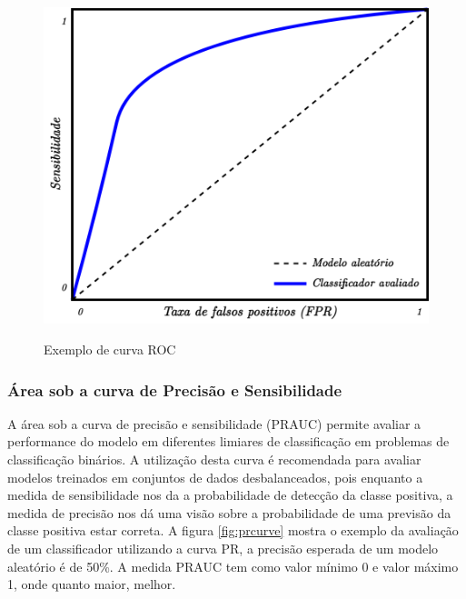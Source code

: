 \begin{figure}[htbp]
	\centering
	\caption{Exemplo de curva ROC}
		\includegraphics[scale=.25]{imagens/auroc.png}
	\label{fig:aucroc}
\end{figure}

\subsubsection{Área sob a curva de Precisão e Sensibilidade}

A área sob a curva de precisão e sensibilidade (PRAUC) permite avaliar a performance do modelo em diferentes limiares de classificação em problemas de classificação binários.
A utilização desta curva é recomendada para avaliar modelos treinados em conjuntos de dados desbalanceados, pois enquanto a medida de sensibilidade nos da a probabilidade de detecção da classe positiva, a medida de precisão nos dá uma visão sobre a probabilidade de uma previsão da classe positiva estar correta. A figura \ref{fig:prcurve} mostra o exemplo da avaliação de um classificador utilizando a curva PR, a precisão esperada de um modelo aleatório é de 50\%. A medida PRAUC tem como valor mínimo 0 e valor máximo 1, onde quanto maior, melhor.

